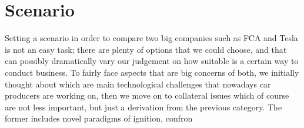 \section{Scenario}

Setting a scenario in order to compare two big companies such as FCA and Tesla is not an easy task; there are plenty of options that we could choose, and that can possibly dramatically vary our judgement on how suitable is a certain way to conduct business. To fairly face aspects that are big concerns of both, we initially thought about which are main technological challenges that nowadays car producers are working on, then we move on to collateral issues which of course are not less important, but just a derivation from the previous category. The former includes novel paradigms of ignition, confron

